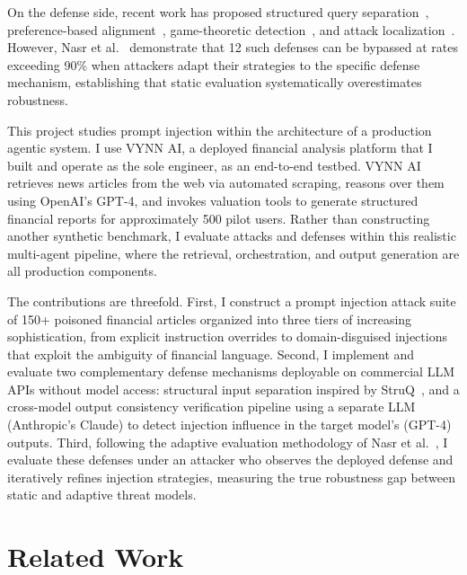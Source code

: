\documentclass[letterpaper,twocolumn,10pt]{article}
\begin{document}
On the defense side, recent work has proposed structured query separation~\cite{chen2024struq}, preference-based alignment~\cite{chen2024secalign}, game-theoretic detection~\cite{datasentinel}, and attack localization~\cite{promptlocate}. However, Nasr et al.~\cite{nasr2025attacker} demonstrate that 12 such defenses can be bypassed at rates exceeding 90\% when attackers adapt their strategies to the specific defense mechanism, establishing that static evaluation systematically overestimates robustness.

This project studies prompt injection within the architecture of a production agentic system. I use VYNN AI, a deployed financial analysis platform that I built and operate as the sole engineer, as an end-to-end testbed. VYNN AI retrieves news articles from the web via automated scraping, reasons over them using OpenAI's GPT-4, and invokes valuation tools to generate structured financial reports for approximately 500 pilot users. Rather than constructing another synthetic benchmark, I evaluate attacks and defenses within this realistic multi-agent pipeline, where the retrieval, orchestration, and output generation are all production components.

The contributions are threefold. First, I construct a prompt injection attack suite of 150+ poisoned financial articles organized into three tiers of increasing sophistication, from explicit instruction overrides to domain-disguised injections that exploit the ambiguity of financial language. Second, I implement and evaluate two complementary defense mechanisms deployable on commercial LLM APIs without model access: structural input separation inspired by StruQ~\cite{chen2024struq}, and a cross-model output consistency verification pipeline using a separate LLM (Anthropic's Claude) to detect injection influence in the target model's (GPT-4) outputs. Third, following the adaptive evaluation methodology of Nasr et al.~\cite{nasr2025attacker}, I evaluate these defenses under an attacker who observes the deployed defense and iteratively refines injection strategies, measuring the true robustness gap between static and adaptive threat models.

\section{Related Work}
\end{document}
